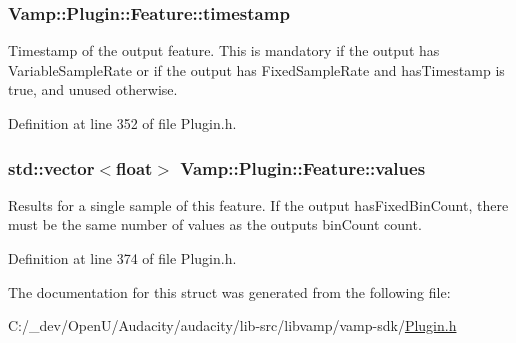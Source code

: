 \subsubsection[{\texorpdfstring{timestamp}{timestamp}}]{ Vamp\+::\+Plugin\+::\+Feature\+::timestamp}\hypertarget{struct_vamp_1_1_plugin_1_1_feature_acaa605f36839c07e76f4882f5e22d8d7}{}\label{struct_vamp_1_1_plugin_1_1_feature_acaa605f36839c07e76f4882f5e22d8d7}
Timestamp of the output feature. This is mandatory if the output has Variable\+Sample\+Rate or if the output has Fixed\+Sample\+Rate and has\+Timestamp is true, and unused otherwise. 

Definition at line 352 of file Plugin.\+h.

\subsubsection[{\texorpdfstring{values}{values}}]{\setlength{\rightskip}{0pt plus 5cm}std\+::vector$<$float$>$ Vamp\+::\+Plugin\+::\+Feature\+::values}\hypertarget{struct_vamp_1_1_plugin_1_1_feature_a60b9f3057386820dbcaec0eb1189ce71}{}\label{struct_vamp_1_1_plugin_1_1_feature_a60b9f3057386820dbcaec0eb1189ce71}
Results for a single sample of this feature. If the output has\+Fixed\+Bin\+Count, there must be the same number of values as the output\textquotesingle{}s bin\+Count count. 

Definition at line 374 of file Plugin.\+h.



The documentation for this struct was generated from the following file\+:\begin{DoxyCompactItemize}
\item 
C\+:/\+\_\+dev/\+Open\+U/\+Audacity/audacity/lib-\/src/libvamp/vamp-\/sdk/\hyperlink{libvamp_2vamp-sdk_2plugin_8h}{Plugin.\+h}\end{DoxyCompactItemize}
